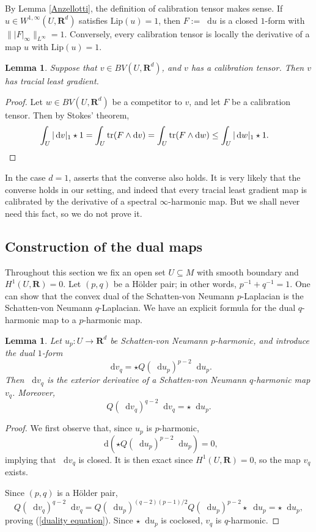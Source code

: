 \documentclass[reqno,11pt]{amsart}
\newcommand{\RR}{\mathbf{R}}
\newcommand*\dif{\mathop{}\!\mathrm{d}}
\DeclareMathOperator{\tr}{tr}
\newcommand{\Lip}{\mathrm{Lip}}
\newtheorem{lemma}[theorem]{Lemma}
\theoremstyle{definition}
\numberwithin{equation}{section}
\begin{document}
By Lemma \ref{Anzellotti}, the definition of calibration tensor makes sense.
If $u \in W^{1, \infty}(U, \RR^d)$ satisfies $\Lip(u) = 1$, then $F := \dif u$ is a closed $1$-form with $\||F|_{\infty}\|_{L^\infty} = 1$.
Conversely, every calibration tensor is locally the derivative of a map $u$ with $\Lip(u) = 1$.

\begin{lemma}\label{calibrated implies least gradient}
Suppose that $v \in BV(U, \RR^d)$, and $v$ has a calibration tensor. Then $v$ has tracial least gradient.
\end{lemma}
\begin{proof}
Let $w \in BV(U, \RR^d)$ be a competitor to $v$, and let $F$ be a calibration tensor. Then by Stokes' theorem,
\begin{align*}
\int_U |\dif v|_{1} \star 1
&= \int_U \tr(F \wedge \dif v) = \int_U \tr(F \wedge \dif w)
\leq \int_U |\dif w|_{1} \star 1. \qedhere
\end{align*}
\end{proof}

In the case $d = 1$, \cite[Theorem 2.5]{Mazon14} asserts that the converse also holds.
It is very likely that the converse holds in our setting, and indeed that every tracial least gradient map is calibrated by the derivative of a spectral $\infty$-harmonic map.
But we shall never need this fact, so we do not prove it.

\subsection{Construction of the dual maps}
Throughout this section we fix an open set $U \subseteq M$ with smooth boundary and $H^1(U, \RR) = 0$.
Let $(p, q)$ be a H\"older pair; in other words, $p^{-1} + q^{-1} = 1$.
One can show that the convex dual of the Schatten-von Neumann $p$-Laplacian is the Schatten-von Neumann $q$-Laplacian.
We have an explicit formula for the dual $q$-harmonic map to a $p$-harmonic map.

\begin{lemma}\label{dual maps are harmonic}
Let $u_p: U \to \RR^d$ be Schatten-von Neumann $p$-harmonic, and introduce the dual $1$-form
$$\dif v_q = \star Q(\dif u_p)^{p - 2} \dif u_p.$$
Then $\dif v_q$ is the exterior derivative of a Schatten-von Neumann $q$-harmonic map $v_q$.
Moreover,
\begin{equation}\label{duality equation}
  Q(\dif v_q)^{q - 2} \dif v_q = \star \dif u_p.
\end{equation}
\end{lemma}
\begin{proof}
We first observe that, since $u_p$ is $p$-harmonic,
$$\dif(\star Q(\dif u_p)^{p - 2} \dif u_p) = 0,$$
implying that $\dif v_q$ is closed.
It is then exact since $H^1(U, \RR) = 0$, so the map $v_q$ exists.

Since $(p, q)$ is a H\"older pair,
$$Q(\dif v_q)^{q - 2} \dif v_q = Q(\dif u_p)^{(q - 2)(p - 1)/2} Q(\dif u_p)^{p - 2} \star \dif u_p = \star \dif u_p,$$
proving (\ref{duality equation}).
Since $\star \dif u_p$ is coclosed, $v_q$ is $q$-harmonic.
\end{proof}
\end{document}
